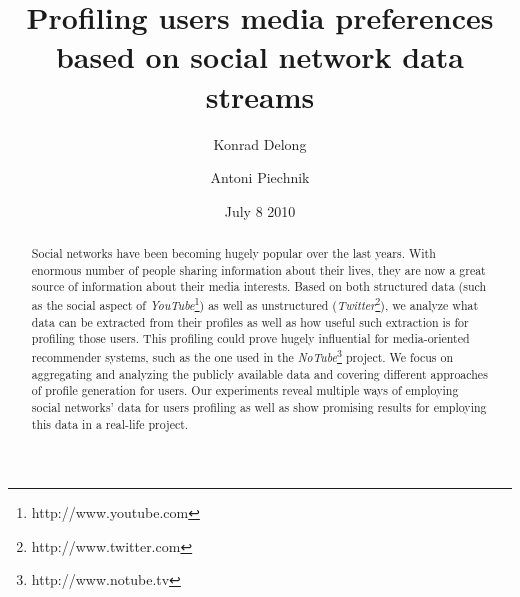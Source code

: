 \documentclass{article}
\begin{document}
\title{\textbf{Profiling users media preferences based on social network data streams}}
\author{Konrad Delong \and Antoni Piechnik}
\date{July 8 2010}

\maketitle

\begin{abstract} Social networks have been becoming hugely popular over the last
years. With enormous number of people sharing information about their lives,
they are now a great source of information about their media interests. Based on both
structured data (such as the social aspect of \textit{YouTube}\footnote{http://www.youtube.com}) as well as unstructured
(\textit{Twitter}\footnote{http://www.twitter.com}), we analyze what data can be extracted from their profiles as well as
how useful such extraction is for profiling those users. This profiling could
prove hugely influential for media-oriented recommender systems, such as the one
used in the \textit{NoTube}\footnote{http://www.notube.tv} project.
We focus on aggregating and analyzing the publicly available data and covering
different approaches of profile generation
for users. Our experiments reveal multiple ways of employing social networks'
data for users profiling as well as show promising results for employing
this data in a real-life project.
\end{abstract}





















\end{document}
